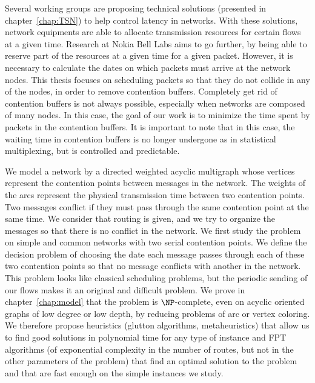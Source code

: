 Several working groups are proposing technical solutions (presented in chapter~\ref{chap:TSN}) to help control latency in networks. With these solutions, network equipments are able to allocate transmission resources for certain flows at a given time. Research at Nokia Bell Labs aims to go further, by being able to reserve part of the resources at a given time for a given packet. However, it is necessary to calculate the dates on which packets must arrive at the network nodes. This thesis focuses on scheduling packets so that they do not collide in any of the nodes, in order to remove contention buffers. Completely get rid of contention buffers is not always possible, especially when networks are composed of many nodes. In this case, the goal of our work is to minimize the time spent by packets in the contention buffers. It is important to note that in this case, the waiting time in contention buffers is no longer undergone as in statistical multiplexing, but is controlled and predictable.

We model a network by a directed weighted acyclic multigraph whose vertices represent the contention points between messages in the network. The weights of the arcs represent the physical transmission time between two contention points. Two messages conflict if they must pass through the same contention point at the same time. We consider that routing is given, and we try to organize the messages so that there is no conflict in the network. We first study the problem on simple and common networks with two serial contention points. 
We define the decision problem of choosing the date each message passes through each of these two contention points so that no message conflicts with another in the network. This problem looks like classical scheduling problems, but the periodic sending of our flows makes it an original and difficult problem. We prove in chapter~\ref{chap:model} that the problem is $\NP$-complete, even on acyclic oriented graphs of low degree or low depth, by reducing problems of arc or vertex coloring. We therefore propose heuristics (glutton algorithms, metaheuristics) that allow us to find good solutions in polynomial time for any type of instance and FPT algorithms (of exponential complexity in the number of routes, but not in the other parameters of the problem) that find an optimal solution to the problem and that are fast enough on the simple instances we study.


